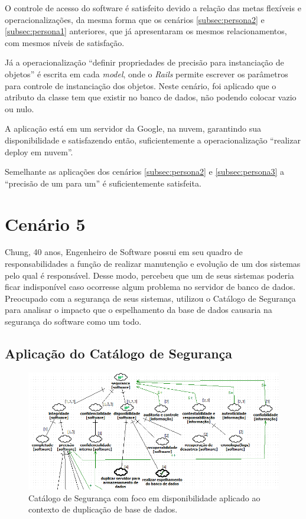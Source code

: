 O controle de acesso do software é satisfeito devido a relação das metas flexíveis e operacionalizações, da mesma forma que os cenários \ref{subsec:persona2} e \ref{subsec:persona1} anteriores, que já apresentaram os mesmos relacionamentos, com mesmos níveis de satisfação.  

Já a operacionalização “definir propriedades de precisão para instanciação de objetos” é escrita em cada \textit{model}, onde o \textit{Rails} permite escrever os parâmetros para controle de instanciação dos objetos. Neste cenário, foi aplicado que o atributo da classe tem que existir no banco de dados, não podendo colocar vazio ou nulo. 

A aplicação está em um servidor da Google, na nuvem, garantindo sua disponibilidade e satisfazendo então, suficientemente a operacionalização “realizar deploy em nuvem”. 

Semelhante as aplicações dos cenários \ref{subsec:persona2} e \ref{subsec:persona3} a “precisão de um para um” é suficientemente satisfeita. 

\section{Cenário 5}
\label{subsec:persona5}

Chung, 40 anos, Engenheiro de Software possui em seu quadro de responsabilidades a função de realizar manutenção e evolução de um dos sistemas pelo qual é responsável. Desse modo, percebeu que um de seus sistemas poderia ficar indisponível caso ocorresse algum problema no servidor de banco de dados. Preocupado com a segurança de seus sistemas, utilizou o Catálogo de Segurança para analisar o impacto que o espelhamento da base de dados causaria na segurança do software como um todo. 

\subsection{Aplicação do Catálogo de Segurança}

\begin{figure}[h!]
	\centering
	\includegraphics[keepaspectratio=true,scale=0.7]{figuras/catalogoPersona5.PNG}
	\caption{Catálogo de Segurança com foco em disponibilidade aplicado ao contexto de duplicação de base de dados.}
	\label{catalogoPersona5}
\end{figure}

